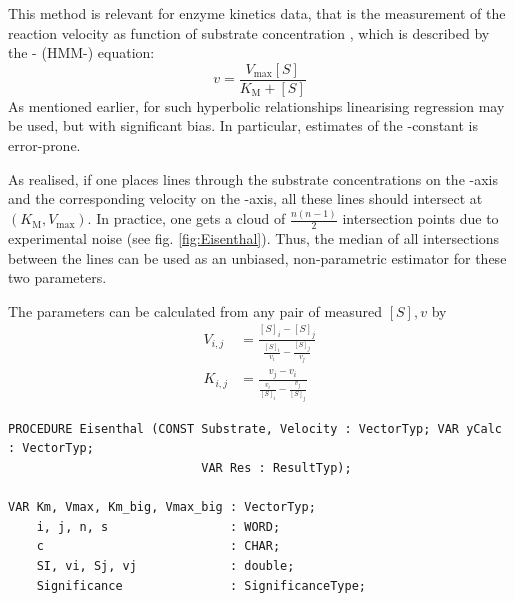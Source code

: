 \begin{refsection}
This method is relevant for enzyme kinetics data, that is the measurement of the reaction velocity  as function of substrate concentration \skalar{[S]}, which is described by the - (HMM-) equation:
\begin{equation}
   v = \frac{V_\mathrm{max} [S]}{K_\mathrm{M} + [S]}
\end{equation}
As mentioned earlier, for such hyperbolic relationships linearising regression may be used, but with significant bias. In particular, estimates of the -constant  is error-prone.

As  \parencite{Eis-74,Cor-74} realised, if one places lines through the substrate concentrations on the -axis and the corresponding velocity on the -axis, all these lines should intersect at \((K_\mathrm{M}, V_\mathrm{max}) \). In practice, one gets a cloud of \(\frac{n (n-1)}{2} \)  intersection points due to experimental noise (see fig. \ref{fig:Eisenthal}). Thus, the median of all intersections between the lines can be used as an unbiased, non-parametric estimator for these two parameters.

The parameters can be calculated from any pair  of measured \([S], v \) by
 \begin{align}
   V_{i,j} &= \frac{[S]_i - [S]_j}{\frac{[S]_i}{v_i} - \frac{[S]_j}{v_j}} \\
   K_{i,j} &= \frac{v_j - v_i}{\frac{v_i}{[S]_i} - \frac{v_j}{[S]_j}}
 \end{align}

\begin{lstlisting}[caption=Direct plot]
PROCEDURE Eisenthal (CONST Substrate, Velocity : VectorTyp; VAR yCalc : VectorTyp;
                           VAR Res : ResultTyp);

VAR Km, Vmax, Km_big, Vmax_big : VectorTyp;
    i, j, n, s                 : WORD;
    c                          : CHAR;
    SI, vi, Sj, vj             : double;
    Significance               : SignificanceType;


\end{lstlisting}
\end{refsection}
